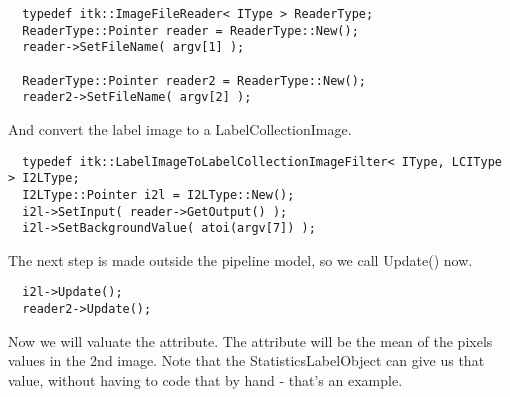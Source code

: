 \documentclass{InsightArticle}
\begin{document}
\small \begin{verbatim}
  typedef itk::ImageFileReader< IType > ReaderType;
  ReaderType::Pointer reader = ReaderType::New();
  reader->SetFileName( argv[1] );

  ReaderType::Pointer reader2 = ReaderType::New();
  reader2->SetFileName( argv[2] );
\end{verbatim} \normalsize
And convert the label image to a LabelCollectionImage.
\small \begin{verbatim}
  typedef itk::LabelImageToLabelCollectionImageFilter< IType, LCIType > I2LType;
  I2LType::Pointer i2l = I2LType::New();
  i2l->SetInput( reader->GetOutput() );
  i2l->SetBackgroundValue( atoi(argv[7]) );
\end{verbatim} \normalsize
The next step is made outside the pipeline model, so we call Update() now.
\small \begin{verbatim}
  i2l->Update();
  reader2->Update();
\end{verbatim} \normalsize
Now we will valuate the attribute. The attribute will be the mean of the pixels
values in the 2nd image. Note that the StatisticsLabelObject can give us that value, without
having to code that by hand - that's an example.
\end{document}
